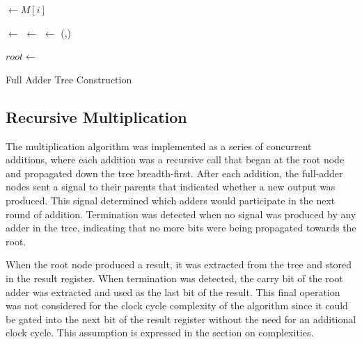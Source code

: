 \documentclass{article}
\begin{document}
\begin{algorithm}[h]
		
	
	\BlankLine
	{
		\Source $\leftarrow M[i]$\;
		\Push{\Queue,\Source}\;
	}
	\BlankLine
	
	{
		\LeftChild $\leftarrow$ \Front{\Queue}\;
		\Pop{\Queue}\;
		\BlankLine
		\RightChild $\leftarrow$ \Front{\Queue}\;
		\Pop{\Queue}\;
		\BlankLine
		\Adder $\leftarrow$ (\LeftChild,\RightChild)\;
		\Push{\Queue,\Adder}\;
	}
	\BlankLine
	
	$root \leftarrow$ \Front{\Queue}\;
	\caption{Full Adder Tree Construction}
	\label{TreeConstruction}
\end{algorithm}

\subsection{Recursive Multiplication}
The multiplication algorithm was implemented as a series of concurrent additions, where each addition was a recursive call that began at the root node and propagated down the tree breadth-first. After each addition, the full-adder nodes sent a signal to their parents that indicated whether a new output was produced. This signal determined which adders would participate in the next round of addition. Termination was detected when no signal was produced by any adder in the tree, indicating that no more bits were being propagated towards the root.

When the root node produced a result, it was extracted from the tree and stored in the result register. When termination was detected, the carry bit of the root adder was extracted and used as the last bit of the result. This final operation was not considered for the clock cycle complexity of the algorithm since it could be gated into the next bit of the result register without the need for an additional clock cycle. This assumption is expressed in the section on complexities.
\end{document}
